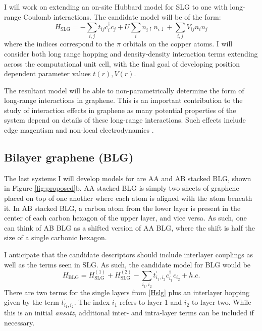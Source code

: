 \documentclass[12pt]{article}
\begin{document}
I will work on extending an on-site Hubbard model for SLG \cite{Zheng2017, Wagner2015} to one with long-range Coulomb interactions.
The candidate model will be of the form:
\begin{equation}
H_\text{SLG} = -\sum_{i,j} t_{ij}c_i^\dagger c_j + U \sum_i n_{i\uparrow}n_{i\downarrow}  + \sum_{i,j} V_{ij} n_i n_j
\label{Hslg}
\end{equation}
where the indices correspond to the $\pi$ orbitals on the copper atoms.
I will consider both long range hopping and density-density interaction terms extending across the computational unit cell, with the final goal of developing position dependent parameter values $t(r), V(r)$.

The resultant model will be able to non-parametrically determine the form
of long-range interactions in graphene.
This is an important contribution to the study of interaction effects in graphene as many potential properties of the system depend on details of these long-range interactions.
Such effects include edge magentism \cite{PhysRevB.95.195420} and non-local electrodynamics \cite{PhysRevB.90.045137}.

\subsection{Bilayer graphene (BLG)}
The last systems I will develop models for are AA and AB stacked BLG, shown in Figure \ref{fig:proposed}b.
AA stacked BLG is simply two sheets of graphene placed on top of one another where each atom is aligned with the atom beneath it.
In AB stacked BLG, a carbon atom from the lower layer is present in the center of each carbon hexagon of the upper layer, and vice versa.
As such, one can think of AB BLG as a shifted version of AA BLG, where the shift is half the size of a single carbonic hexagon.

I anticipate that the candidate descriptors should include interlayer couplings as well as the terms seen in SLG.
As such, the candidate model for BLG would be
\begin{equation}
H_\text{BLG} = H_\text{SLG}^{(1)} + H_\text{SLG}^{(2)} - \sum_{i_1, i_2} t_{i_1, i_2}^\prime c_{i_1}^\dagger c_{i_2} + h.c.
\label{Hblg}
\end{equation}
There are two terms for the single layers from \eqref{Hslg} plus an interlayer hopping given by the term $t_{i_1, i_2}^\prime.$  
The index $i_1$ refers to layer 1 and $i_2$ to layer two.
While this is an initial \textit{ansatz}, additional inter- and intra-layer terms can be included if necessary.
\end{document}
